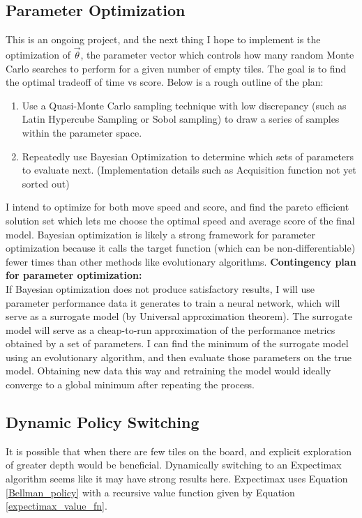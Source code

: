 \documentclass{article}
\begin{document}
\subsection{Parameter Optimization}

This is an ongoing project, and the next thing I hope to implement is the optimization of $\vec{\theta}$, the parameter vector which controls how many random Monte Carlo searches to perform for a given number of empty tiles.  The goal is to find the optimal tradeoff of time vs score.  Below is a rough outline of the plan:
\begin{enumerate}
	\item Use a Quasi-Monte Carlo sampling technique with low discrepancy (such as Latin Hypercube Sampling or Sobol sampling) to draw a series of samples within the parameter space.
	\item Repeatedly use Bayesian Optimization to determine which sets of parameters to evaluate next. (Implementation details such as Acquisition function not yet sorted out)
\end{enumerate}

I intend to optimize for both move speed and score, and find the pareto efficient solution set which lets me choose the optimal speed and average score of the final model.   Bayesian optimization is likely a strong framework for parameter optimization because it calls the target function (which can be non-differentiable) fewer times than other methods like evolutionary algorithms.
\textbf{Contingency plan for parameter optimization:}\\

If Bayesian optimization does not produce satisfactory results, I will use parameter performance data it generates to train a neural network, which will serve as a surrogate model (by Universal approximation theorem).  The surrogate model will serve as a cheap-to-run approximation of the performance metrics obtained by a set of parameters.  I can find the minimum of the surrogate model using an evolutionary algorithm, and then evaluate those parameters on the true model.  Obtaining new data this way and retraining the model would ideally converge to a global minimum after repeating the process.

\subsection{Dynamic Policy Switching}
It is possible that when there are few tiles on the board, and explicit exploration of greater depth would be beneficial.  Dynamically switching to an Expectimax algorithm seems like it may have strong results here.  Expectimax uses Equation \ref{Bellman_policy} with a recursive value function given by Equation  \ref{expectimax_value_fn}.
\end{document}
